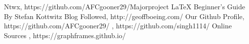 
\begin{thebibliography}{9}
\bibitem{} Ntwx, https://github.com/AFCgooner29/Majorproject
\bibitem{} \LaTeX{} Beginner's Guide By Stefan Kottwitz 
\bibitem{} Blog Followed, http://geoffboeing.com/
\bibitem{} Our Github Profile, https://github.com/AFCgooner29/ , https://github.com/singh1114/
\bibitem{} Online Sources , https://graphframes.github.io/

\end{thebibliography}


